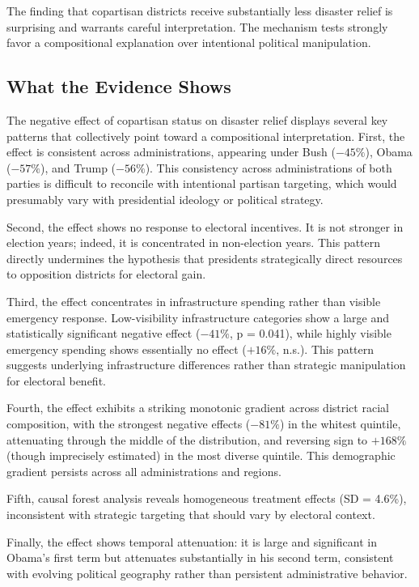 \documentclass[12pt,letterpaper,oneside]{book}
\begin{document}
The finding that copartisan districts receive substantially less disaster relief is surprising and warrants careful interpretation. The mechanism tests strongly favor a compositional explanation over intentional political manipulation.

\subsection{What the Evidence Shows}

The negative effect of copartisan status on disaster relief displays several key patterns that collectively point toward a compositional interpretation. First, the effect is consistent across administrations, appearing under Bush ($-45\%$), Obama ($-57\%$), and Trump ($-56\%$). This consistency across administrations of both parties is difficult to reconcile with intentional partisan targeting, which would presumably vary with presidential ideology or political strategy.

Second, the effect shows no response to electoral incentives. It is not stronger in election years; indeed, it is concentrated in non-election years. This pattern directly undermines the hypothesis that presidents strategically direct resources to opposition districts for electoral gain.

Third, the effect concentrates in infrastructure spending rather than visible emergency response. Low-visibility infrastructure categories show a large and statistically significant negative effect ($-41\%$, p = 0.041), while highly visible emergency spending shows essentially no effect ($+16\%$, n.s.). This pattern suggests underlying infrastructure differences rather than strategic manipulation for electoral benefit.

Fourth, the effect exhibits a striking monotonic gradient across district racial composition, with the strongest negative effects ($-81\%$) in the whitest quintile, attenuating through the middle of the distribution, and reversing sign to $+168\%$ (though imprecisely estimated) in the most diverse quintile. This demographic gradient persists across all administrations and regions.

Fifth, causal forest analysis reveals homogeneous treatment effects (SD = 4.6\%), inconsistent with strategic targeting that should vary by electoral context.

Finally, the effect shows temporal attenuation: it is large and significant in Obama's first term but attenuates substantially in his second term, consistent with evolving political geography rather than persistent administrative behavior.
\end{document}
